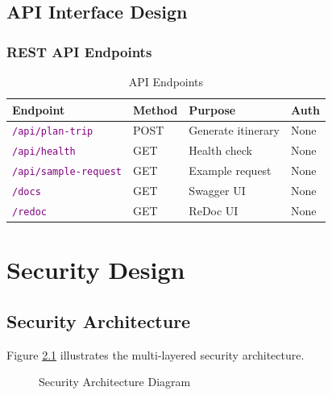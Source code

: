 \documentclass[12pt,a4paper]{report}
\newcommand{\apiendpoint}[1]{\textcolor{purple}{\texttt{#1}}}
\begin{document}
\section{API Interface Design}

\subsection{REST API Endpoints}

\begin{table}[H]
\centering
\begin{tabular}{|l|l|l|l|}
\hline
\textbf{Endpoint} & \textbf{Method} & \textbf{Purpose} & \textbf{Auth} \\
\hline
\apiendpoint{/api/plan-trip} & POST & Generate itinerary & None \\
\hline
\apiendpoint{/api/health} & GET & Health check & None \\
\hline
\apiendpoint{/api/sample-request} & GET & Example request & None \\
\hline
\apiendpoint{/docs} & GET & Swagger UI & None \\
\hline
\apiendpoint{/redoc} & GET & ReDoc UI & None \\
\hline
\end{tabular}
\caption{API Endpoints}
\label{tab:api-endpoints}
\end{table}


\chapter{Security Design}

\section{Security Architecture}

Figure \ref{fig:security-arch} illustrates the multi-layered security architecture.

\begin{figure}[H]
    \centering
    \caption{Security Architecture Diagram}
    \label{fig:security-arch}
\end{figure}
\end{document}
